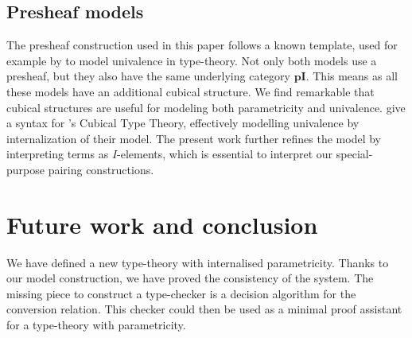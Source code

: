\documentclass[english]{PaperTools/latex/lipics}
\def\pI{\ensuremath{\mathbf{pI}}}
\begin{document}
\subsection{Presheaf models}

The presheaf construction used in this paper follows a known template,
used for example by \citet{bezem2014model,DBLP:journals/corr/Pitts14}
to model univalence in type-theory. Not only both models use a
presheaf, but they also have the same underlying category $\pI$.
This means as all these models have an additional cubical structure.
We find remarkable that cubical structures are useful for modeling both
parametricity and univalence.
\cite{altenkirch2014syntax} give a syntax for
\citeauthor{bezem2014model}'s Cubical Type Theory, effectively modelling
univalence by internalization of their model.
The present work further refines the model by interpreting terms as
$I$-elements, which is essential to interpret our special-purpose
pairing constructions.

\section{Future work and conclusion}
We have defined a new type-theory with internalised parametricity.
Thanks to our model construction, we have proved the consistency of
the system. The missing piece to construct a type-checker is a
decision algorithm for the conversion relation.  This checker could
then be used as a minimal proof assistant for a type-theory with
parametricity.



\end{document}
